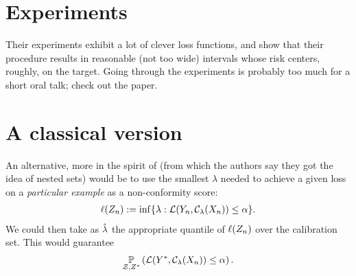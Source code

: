 \documentclass[twoside,11pt]{article}
\numberwithin{equation}{section}
\begin{document}
\section{Experiments}

Their experiments exhibit a lot of clever loss functions, and show that
their procedure results in reasonable (not too wide) intervals whose
risk centers, roughly, on the target.  Going through the experiments
is probably too much for a short oral talk; check out the paper.



\section{A classical version}

An alternative, more in the spirit of \citet{gupta:2022:nestedconformal} (from
which the authors say they got the idea of nested sets) would be to use the
smallest $\lambda$ needed to achieve a given loss on a \textit{particular
example} as a non-conformity score:
%
\begin{align*}
%
\ell(\z_n) := \inf \{ \lambda: \loss(\y_n, \cfun_\lambda(\x_n)) \le \alpha \}.
%
\end{align*}
%
We could then take as $\hat{\lambda}$ the appropriate quantile of $\ell(Z_n)$ over
the calibration set.  This would guarantee
%
\begin{align*}
%
\p{\calset,\znew}{\loss(\ynew, \cfun_\lambda(\x_n)) \le \alpha}.
%
\end{align*}
%





\newpage

\printbibliography{}
\end{document}
